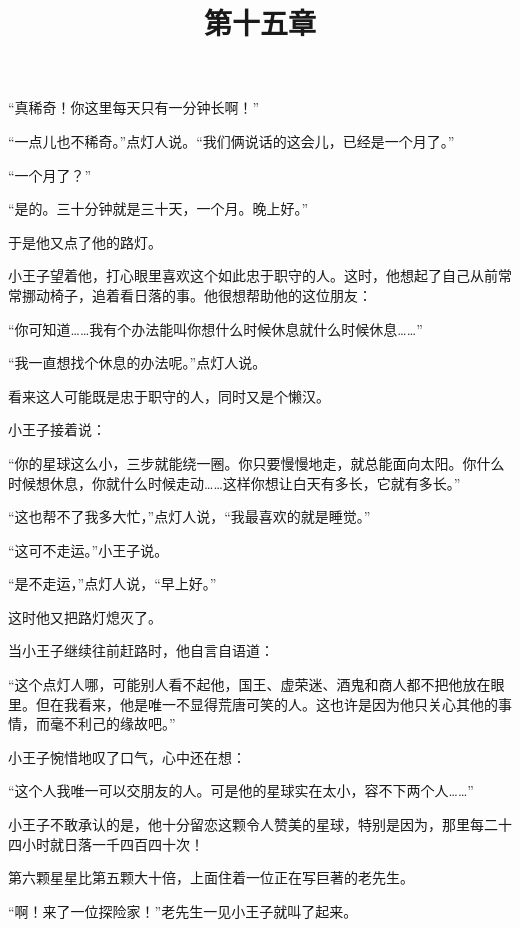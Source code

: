 “真稀奇！你这里每天只有一分钟长啊！”

“一点儿也不稀奇。”点灯人说。“我们俩说话的这会儿，已经是一个月了。”

“一个月了？”

“是的。三十分钟就是三十天，一个月。晚上好。”

于是他又点了他的路灯。

小王子望着他，打心眼里喜欢这个如此忠于职守的人。这时，他想起了自己从前常常挪动椅子，追着看日落的事。他很想帮助他的这位朋友：

{\startalignment[center]
 \stopalignment}

“你可知道\ldots{}\ldots{}我有个办法能叫你想什么时候休息就什么时候休息\ldots{}\ldots{}”

“我一直想找个休息的办法呢。”点灯人说。

看来这人可能既是忠于职守的人，同时又是个懒汉。

小王子接着说：

“你的星球这么小，三步就能绕一圈。你只要慢慢地走，就总能面向太阳。你什么时候想休息，你就什么时候走动\ldots{}\ldots{}这样你想让白天有多长，它就有多长。”

“这也帮不了我多大忙，”点灯人说，“我最喜欢的就是睡觉。”

“这可不走运。”小王子说。

“是不走运，”点灯人说，“早上好。”

这时他又把路灯熄灭了。

当小王子继续往前赶路时，他自言自语道：

“这个点灯人哪，可能别人看不起他，国王、虚荣迷、酒鬼和商人都不把他放在眼里。但在我看来，他是唯一不显得荒唐可笑的人。这也许是因为他只关心其他的事情，而毫不利己的缘故吧。”

小王子惋惜地叹了口气，心中还在想：

“这个人我唯一可以交朋友的人。可是他的星球实在太小，容不下两个人\ldots{}\ldots{}”

小王子不敢承认的是，他十分留恋这颗令人赞美的星球，特别是因为，那里每二十四小时就日落一千四百四十次！

\title{第十五章}

第六颗星星比第五颗大十倍，上面住着一位正在写巨著的老先生。

{\startalignment[center]
 \stopalignment}

“啊！来了一位探险家！”老先生一见小王子就叫了起来。

